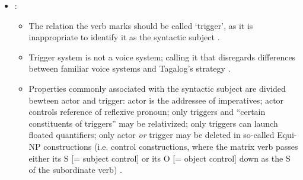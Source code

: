 \begin{itemize}
	\item \citet[1674--1676]{schachter2015}:
	\begin{itemize}
		\item The relation the verb marks should be called `trigger', as it is
		inappropriate to identify it as the syntactic subject
		\citep[1674]{schachter2015}.
		\item Trigger system is not a voice system; calling it that disregards
		differences between familiar voice systems and Tagalog's strategy
		\citep[1674]{schachter2015}.
		\item Properties commonly associated with the syntactic subject are
		divided bewteen actor and trigger: actor is the addressee of
		imperatives; actor controls reference of reflexive pronoun; only
		triggers and ``certain constituents of triggers'' may be relativized;
		only triggers can launch floated quantifiers; only actor \emph{or}
		trigger may be deleted in so-called Equi-NP constructions (i.e. control
		constructions, where the matrix verb passes either its S [= subject
		control] or its O [= object control] down as the S of the subordinate
		verb) \citep[1675]{schachter2015}.
	\end{itemize}


\end{itemize}
